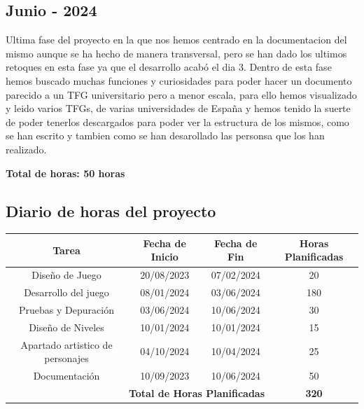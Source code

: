 \documentclass[a4paper]{article}
\begin{document}
\subsection{Junio - 2024}
Ultima fase del proyecto en la que nos hemos centrado en la documentacion del mismo aunque se ha hecho de manera transversal, pero se han dado los ultimos retoques en esta fase ya que el desarrollo acabó el dia 3. Dentro de esta fase hemos buscado muchas funciones y curiosidades para poder hacer un documento parecido a un TFG universitario pero a menor escala, para ello hemos visualizado y leido varios TFGs, de varias universidades de España y hemos tenido la suerte de poder tenerlos descargados para poder ver la estructura de los mismos, como se han escrito y tambien como se han desarollado las personsa que los han realizado.
\begin{flushright}
    \bf Total de horas: 50 horas
\end{flushright}

\subsection{Diario de horas del proyecto}
\begin{table}[ht]
    \centering
    \begin{tabular}{|c|c|c|c|}
        \hline
        \textbf{Tarea}                                             & \textbf{Fecha de Inicio} & \textbf{Fecha de Fin} & \textbf{Horas Planificadas} \\
        \hline
        Diseño de Juego                                            & 20/08/2023               & 07/02/2024            & 20                          \\
        \hline
        Desarrollo del juego                                       & 08/01/2024               & 03/06/2024            & 180                         \\
        \hline
        Pruebas y Depuración                                       & 03/06/2024               & 10/06/2024            & 30                          \\
        \hline
        Diseño de Niveles                                          & 10/01/2024               & 10/01/2024            & 15                          \\
        \hline
        Apartado artistico de personajes                           & 04/10/2024               & 10/04/2024            & 25                          \\
        \hline
        Documentación                                              & 10/09/2023               & 10/06/2024            & 50                          \\
        \hline
        \multicolumn{3}{|r|}{\textbf{Total de Horas Planificadas}} & \textbf{320}                                                                   \\
        \hline
    \end{tabular}
    \label{tab:planificacion-horas}
\end{table}
\clearpage
\end{document}
